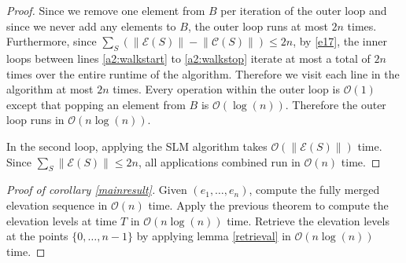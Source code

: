 \documentclass[11pt,a4paper]{article}
\newcommand{\norm}[1]{\left\lVert #1 \right\rVert}
\newcommand{\bO}{\mathcal{O}}
\newcommand{\C}{\mathcal{C}}
\newcommand{\E}{\mathcal{E}}
\begin{document}
\begin{proof}
Since we remove one element from $B$ per iteration of the outer loop and since we never add any elements to $B$, the outer loop runs at most $2n$ times.
Furthermore, since $\sum_S\left(\norm{\E(S)} - \norm{\C(S)}\right) \le 2n$, by \ref{e17}, the inner loops between lines \ref{a2:walkstart} to \ref{a2:walkstop} iterate at most a total of $2n$ times over the entire runtime of the algorithm.
Therefore we visit each line in the algorithm at most $2n$ times.
Every operation within the outer loop is $\bO(1)$ except that popping an element from $B$ is $\bO(\log(n))$.
Therefore the outer loop runs in $\bO(n\log(n))$.

In the second loop, applying the SLM algorithm takes $\bO(\norm{\E(S)})$ time.
Since $\sum_S\norm{\E(S)}\le 2n$, all applications combined run in $\bO(n)$ time.
\end{proof}

\begin{proof}[Proof of corollary \ref{mainresult}] 
Given $(e_1,\ldots,e_n)$, compute the fully merged elevation sequence in $\bO(n)$ time.
Apply the previous theorem to compute the elevation levels at time $T$ in $\bO(n\log(n))$ time.
Retrieve the elevation levels at the points $\{0,\ldots,n-1\}$ by applying lemma \ref{retrieval} in $\bO(n\log(n))$ time.
\end{proof}
\end{document}
